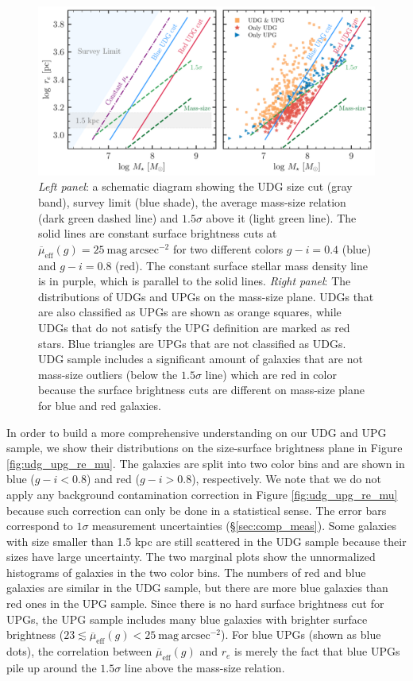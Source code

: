 \documentclass[twocolumn,astrosymb,twocolappendix]{aastex631}
\newcommand{\sbunit}{\mathrm{mag\ arcsec}^{-2}}
\newcommand{\sbeff}{\overline{\mu}_{\mathrm{eff}}(g)}
\begin{document}
\begin{CJK*}{UTF8}{gbsn}
\begin{figure}
	\vbox{ 
		\centering
		\includegraphics[width=1\linewidth]{mass_size_plane_new.pdf}
	}
    \caption{\textit{Left panel}: a schematic diagram showing the UDG size cut (gray band), survey limit (blue shade), the average mass-size relation (dark green dashed line) and $1.5\sigma$ above it (light green line). The solid lines are constant surface brightness cuts at $\sbeff=25\ \sbunit$ for two different colors $g-i=0.4$ (blue) and $g-i=0.8$ (red). The constant surface stellar mass density line is in purple, which is parallel to the solid lines. \textit{Right panel}: The distributions of UDGs and UPGs on the mass-size plane. UDGs that are also classified as UPGs are shown as orange squares, while UDGs that do not satisfy the UPG definition are marked as red stars. Blue triangles are UPGs that are not classified as UDGs. UDG sample includes a significant amount of galaxies that are not mass-size outliers (below the $1.5\sigma$ line) which are red in color because the surface brightness cuts are different on mass-size plane for blue and red galaxies.
    }
    \label{fig:mass_size}
\end{figure}

In order to build a more comprehensive understanding on our UDG and UPG sample, we show their distributions on the size-surface brightness plane in Figure \ref{fig:udg_upg_re_mu}. The galaxies are split into two color bins and are shown in blue ($g-i < 0.8$) and red ($g-i > 0.8$), respectively. We note that we do not apply any background contamination correction in Figure \ref{fig:udg_upg_re_mu} because such correction can only be done in a statistical sense. The error bars correspond to $1\sigma$ measurement uncertainties (\S\ref{sec:comp_meas}). Some galaxies with size smaller than 1.5 kpc are still scattered in the UDG sample because their sizes have large uncertainty. The two marginal plots show the unnormalized histograms of galaxies in the two color bins. The numbers of red and blue galaxies are similar in the UDG sample, but there are more blue galaxies than red ones in the UPG sample. Since there is no hard surface brightness cut for UPGs, the UPG sample includes many blue galaxies with brighter surface brightness ($23 \lesssim \sbeff < 25\ \sbunit$). For blue UPGs (shown as blue dots), the correlation between $\sbeff$ and $r_e$ is merely the fact that blue UPGs pile up around the $1.5\sigma$ line above the mass-size relation. 


\end{CJK*}
\end{document}
